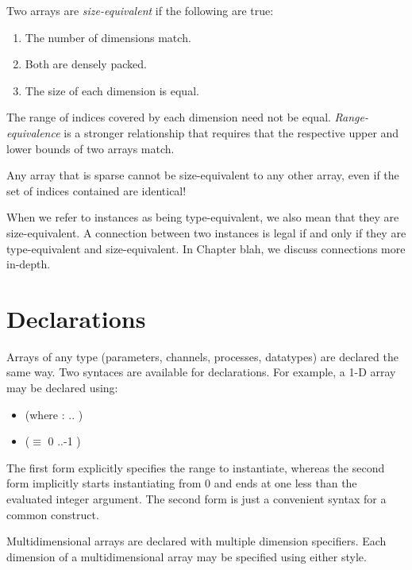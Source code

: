 Two arrays are \emph{size-equivalent} if the following are true:
\begin{enumerate}
\item The number of dimensions match.
\item Both are densely packed.  
\item The size of each dimension is equal.  
\end{enumerate}

The range of indices covered by each dimension need not be equal.  
\emph{Range-equivalence} is a stronger relationship that 
requires that the respective upper and lower bounds of two arrays match.  

Any array that is sparse cannot be size-equivalent to any other array, 
even if the set of indices contained are identical!  

When we refer to instances as being type-equivalent, 
we also mean that they are size-equivalent.  
A connection between two instances is legal if and only if 
they are type-equivalent and size-equivalent.  
In Chapter blah, we discuss connections more in-depth.  

\section{Declarations}
\label{sec:arrays:declarations}

Arrays of any type (parameters, channels, processes, datatypes) 
are declared the same way.  
Two syntaces are available for declarations. 
For example, a 1-D array may be declared using:
\begin{itemize}
\item {} \ttt{[}  \ttt{]} \hfill
	(where  :  .. )
\item {} \ttt{[}  \ttt{]} \hfill
	($\equiv$  \ttt{[} 0 ..-1 \ttt{]})
\end{itemize}
The first form explicitly specifies the range to instantiate, 
whereas the second form implicitly starts instantiating from 0 and 
ends at one less than the evaluated integer argument.  
The second form is just a convenient syntax for a common construct.  

Multidimensional arrays are declared with multiple dimension specifiers.  
Each dimension of a multidimensional array may be specified using
either style.  

